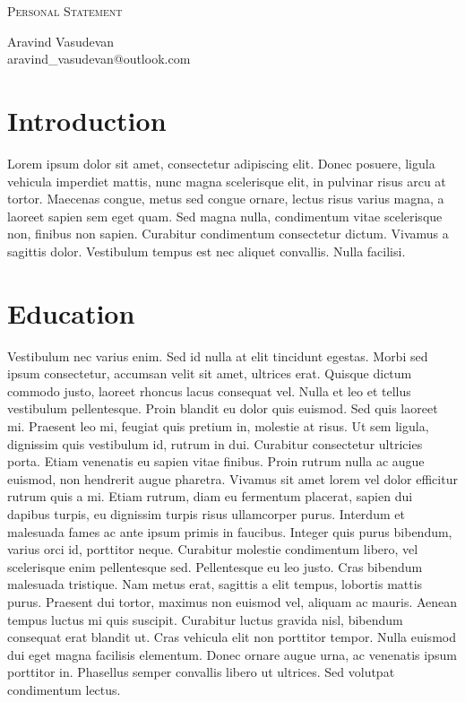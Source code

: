\documentclass[12pt, letterpaper]{article}
\makeatletter
\renewcommand{\title}{Personal Statement}
\newcommand{\name}{Aravind Vasudevan}
\newcommand{\email}{aravind\_vasudevan@outlook.com}
\renewcommand{\maketitle}{
  \begin{center}{\color{headingcolor} \huge \scshape \title}\end{center}
  \begin{center}\vspace{0.2em} {\color{headingcolor} \Large \name\\}
    {\color{headingcolor} \email}\end{center}
}
\makeatother
\begin{document}
\maketitle

\section*{Introduction}
Lorem ipsum dolor sit amet, consectetur adipiscing elit. Donec posuere, ligula vehicula imperdiet mattis, nunc magna scelerisque elit, in pulvinar risus arcu at tortor. Maecenas congue, metus sed congue ornare, lectus risus varius magna, a laoreet sapien sem eget quam. Sed magna nulla, condimentum vitae scelerisque non, finibus non sapien. Curabitur condimentum consectetur dictum. Vivamus a sagittis dolor. Vestibulum tempus est nec aliquet convallis. Nulla facilisi.

\section*{Education}
Vestibulum nec varius enim. Sed id nulla at elit tincidunt egestas. Morbi sed ipsum consectetur, accumsan velit sit amet, ultrices erat. Quisque dictum commodo justo, laoreet rhoncus lacus consequat vel. Nulla et leo et tellus vestibulum pellentesque. Proin blandit eu dolor quis euismod. Sed quis laoreet mi. Praesent leo mi, feugiat quis pretium in, molestie at risus. Ut sem ligula, dignissim quis vestibulum id, rutrum in dui. Curabitur consectetur ultricies porta. Etiam venenatis eu sapien vitae finibus. Proin rutrum nulla ac augue euismod, non hendrerit augue pharetra. Vivamus sit amet lorem vel dolor efficitur rutrum quis a mi. Etiam rutrum, diam eu fermentum placerat, sapien dui dapibus turpis, eu dignissim turpis risus ullamcorper purus. Interdum et malesuada fames ac ante ipsum primis in faucibus. Integer quis purus bibendum, varius orci id, porttitor neque. Curabitur molestie condimentum libero, vel scelerisque enim pellentesque sed. Pellentesque eu leo justo. Cras bibendum malesuada tristique. Nam metus erat, sagittis a elit tempus, lobortis mattis purus. Praesent dui tortor, maximus non euismod vel, aliquam ac mauris. Aenean tempus luctus mi quis suscipit. Curabitur luctus gravida nisl, bibendum consequat erat blandit ut. Cras vehicula elit non porttitor tempor. Nulla euismod dui eget magna facilisis elementum. Donec ornare augue urna, ac venenatis ipsum porttitor in. Phasellus semper convallis libero ut ultrices. Sed volutpat condimentum lectus.
\end{document}
